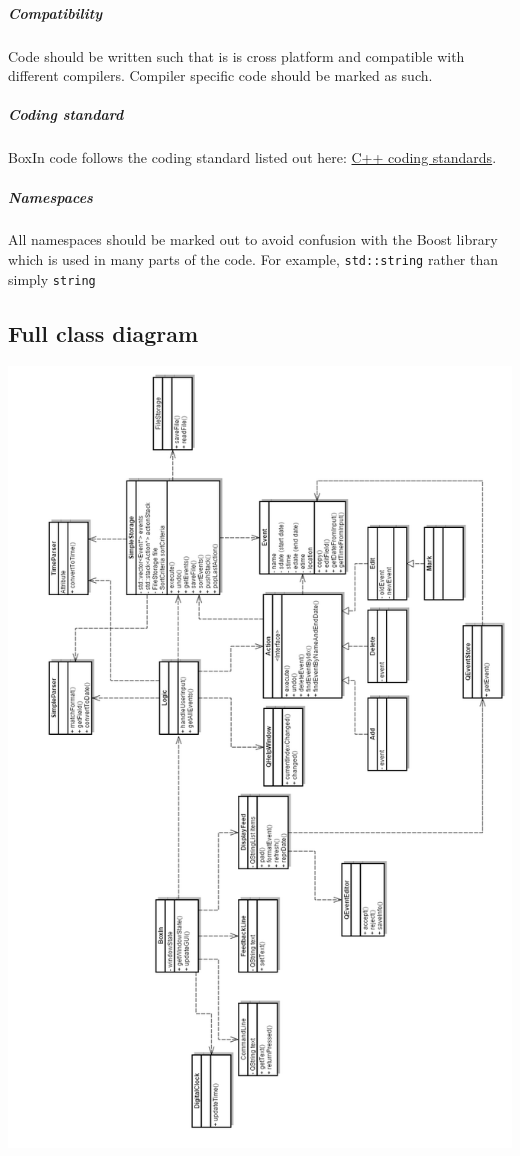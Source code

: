 \documentclass[12pt]{extarticle}
\begin{document}
\subparagraph{Compatibility}
Code should be written such that is is cross platform and compatible with different compilers. Compiler specific code should be marked as such.

\subparagraph{Coding standard}
BoxIn code follows the coding standard listed out here: \href{https://docs.google.com/document/pub?id=1tJD2XQo3hUb0SZniswLqg0vkmccv7vGBV7\_1AhTYK04\&amp\&embedded=true}{C++ coding standards}.

\subparagraph{Namespaces}
All namespaces should be marked out to avoid confusion with the Boost library which is used in many parts of the code. For example, \texttt{std::string} rather than simply \texttt{string}\\
\newpage
\subsection{Full class diagram}
\includegraphics[width=\textwidth, height=\textheight]{class_diagram}
\end{document}
